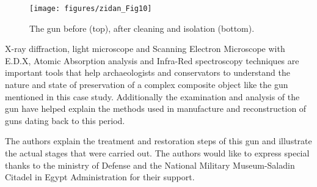 \begin{figure}[!htb]
	\centering
	\texttt{[image: figures/zidan\_Fig10]}
	\caption{The gun before (top), after cleaning and isolation (bottom).}
	\label{fig:Fig10}
\end{figure}
X-ray diffraction, light microscope and Scanning Electron Microscope with E.D.X, Atomic Absorption analysis and Infra-Red spectroscopy techniques are important tools that help archaeologists and conservators to understand the nature and state of preservation of a complex composite object like the gun mentioned in this case study. Additionally the examination and analysis of the gun have helped explain the methods used in manufacture and reconstruction of guns dating back to this period. 

The authors explain the treatment and restoration steps of this gun and illustrate the actual stages that were carried out. 
\myseparator
The authors would like to express special thanks to the ministry of Defense and the National Military Museum-Saladin Citadel in Egypt Administration for their support. 


\printbibliography[heading=subbibnumbered] 
\label{zidan:lastpage}
\closingarticle
